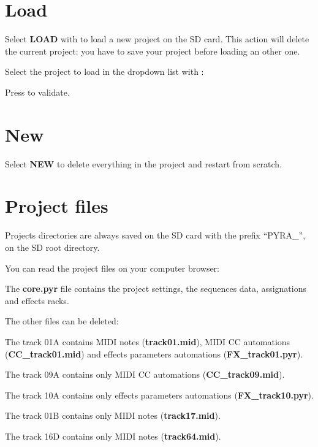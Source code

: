 

\section{Load}

Select \textbf{LOAD} with \encodericon{} to load a new project on the SD card. This action will delete the current project: you have to save your project before loading an other one.

Select the project to load in the dropdown list with \encodericon{}:


Press \encodericon{} to validate.


\section{New}

Select \textbf{NEW} to delete everything in the project and restart from scratch.


\section{Project files}

Projects directories are always saved on the SD card with the prefix ``PYRA\_'', on the SD root directory.

You can read the project files on your computer browser:


The \textbf{core.pyr} file contains the project settings, the sequences data, assignations and effects racks.

The other files can be deleted:

The track 01A contains MIDI notes (\textbf{track01.mid}), MIDI CC automations (\textbf{CC\_track01.mid}) and effects parameters automations (\textbf{FX\_track01.pyr}).

The track 09A contains only MIDI CC automations (\textbf{CC\_track09.mid}).

The track 10A contains only effects parameters automations (\textbf{FX\_track10.pyr}).

The track 01B contains only MIDI notes (\textbf{track17.mid}).

The track 16D contains only MIDI notes (\textbf{track64.mid}).


